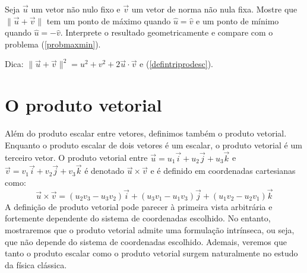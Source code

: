 \begin{exer}Seja $\vec{u}$ um vetor não nulo fixo e $\vec{v}$ um vetor de norma não nula fixa. Mostre que $\|\vec{u}+\vec{v}\|$ tem um ponto de máximo quando $\hat{u}=\hat{v}$ e um ponto de mínimo quando $\hat{u}=-\hat{v}$. Interprete o resultado geometricamente e compare com o problema (\ref{probmaxmin}). 
\end{exer}
 Dica: $\|\vec{u}+\vec{v}\|^2=u^2+v^2+2\vec{u}\cdot\vec{v}$ e (\ref{defintriprodesc}).

 
\section{O produto vetorial}
Além do produto escalar entre vetores, definimos também o produto vetorial. Enquanto o produto escalar de dois vetores é um escalar, o produto vetorial é um terceiro vetor. O produto vetorial entre $\vec{u}=u_1\vec{i}+u_2\vec{j}+u_3\vec{k}$ e $\vec{v}=v_1\vec{i}+v_2\vec{j}+v_3\vec{k}$ é denotado $\vec{u}\times\vec{v}$ e é definido em coordenadas cartesianas como:
\begin{equation}\label{defprodvec} \vec{u}\times\vec{v}=\left(u_2v_3-u_3v_2\right)\vec{i}+\left(u_3v_1-u_1v_3\right)\vec{j}+\left(u_1v_2-u_2v_1\right)\vec{k}
\end{equation}
A definição de produto vetorial pode parecer à primeira vista arbitrária e fortemente dependente do sistema de coordenadas escolhido. No entanto, mostraremos que  o produto vetorial admite uma formulação intrínseca, ou seja, que não depende do sistema de coordenadas escolhido. Ademais, veremos que tanto o produto escalar como o produto vetorial surgem naturalmente no estudo da física clássica.


